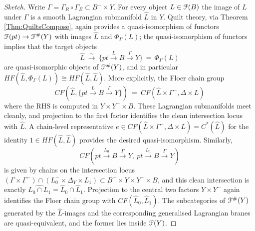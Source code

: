 \documentclass[reqno,10pt]{amsart}
\numberwithin{equation}{section}
\newcommand{\scrF}{\EuScript{F}}
\theoremstyle{remark}
\begin{document}
\begin{proof}[Sketch]
 Write $\Gamma=\Gamma_R\circ\Gamma_E \subset B^- \times Y$.  
For every object $L\in \scrF(B)$ the image of $L$ under $\Gamma$ is a smooth Lagrangian submanifold $\hat{L}$ in $Y$. Quilt theory, via Theorem \ref{Thm:QuiltsCompose}, again provides a quasi-isomorphism of functors $\scrF(pt) \rightarrow \scrF^{\#}(Y)$ with images $\hat{L}$ and $\Phi_{\Gamma}(L)$; the quasi-isomorphism of functors implies that the target objects
\[
\hat{L} \ \stackrel{\sim}{\longrightarrow} \ \{pt \stackrel{L}{\longrightarrow} B \stackrel{{\Gamma}}{\longrightarrow} Y\} \, = \, \Phi_{\Gamma}(L)
\]
 are quasi-isomorphic objects of $\scrF^{\#}(Y)$, and in particular $HF(\hat{L}, \Phi_{\Gamma}(L)) \cong HF(\hat{L}, \hat{L})$.  More explicitly, the Floer chain group
\[
CF(\hat{L}, \{pt \stackrel{L}{\rightarrow}B \stackrel{\Gamma}{\rightarrow} Y\}) \ = \ CF(\hat{L} \times \Gamma^-, \Delta \times L)
\] 
where the RHS is computed in $Y \times Y^- \times B$.  These Lagrangian submanifolds meet cleanly, and projection to the first factor identifies the clean intersection locus with $\hat{L}$.  A chain-level representative $e \in CF(\hat{L} \times \Gamma^-, \Delta \times L) = C^*(\hat{L})$ for the identity $1 \in HF(\hat{L},\hat{L})$  provides the desired quasi-isomorphism.  Similarly, 
\[
CF(pt  \stackrel{L_0}{\rightarrow}B \stackrel{\Gamma}{\rightarrow} Y,  \ pt \stackrel{L_1}{\rightarrow}B \stackrel{\Gamma}{\rightarrow} Y) 
\]
is given by chains on the intersection locus $(\Gamma \times \Gamma^-) \cap (L_0^- \times \Delta_Y \times L_1) \subset B^- \times Y \times Y^- \times B$, and this clean intersection is exactly $\widehat{L_0 \cap L_1} = \hat{L}_0 \cap \hat{L}_1$.  Projection to the central two factors $Y\times Y^-$ again identifies the Floer chain group with $CF(\hat{L}_0, \hat{L}_1)$.  The subcategories of $\scrF^{\#}(Y)$ generated by the $\hat{L}$-images and the corresponding generalised Lagrangian branes are quasi-equivalent, and the former lies inside $\scrF(Y)$.
\end{proof}
\end{document}
